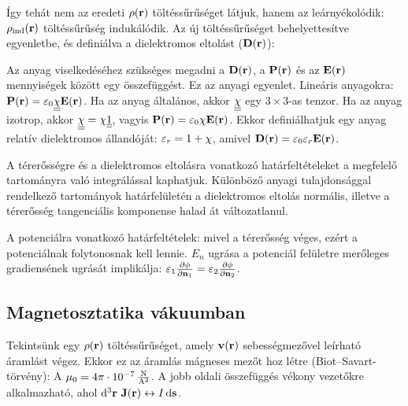    Így tehát nem az eredeti $\rho(\mathbf{r})$ töltéssűrűséget látjuk, hanem az leárnyékolódik: 
   $\rho_\text{ind}(\mathbf{r})$ töltéssűrűség indukálódik. 
   Az új töltéssűrűséget behelyettesítve  egyenletbe, és definiálva a dielektromos eltolást ($\mathbf{D}(\mathbf{r})$):
   
   Az anyag viselkedéséhez szükséges megadni a $\mathbf{D}(\mathbf{r})$, a $\mathbf{P}(\mathbf{r})$ és az $\mathbf{E}(\mathbf{r})$ mennyiségek között egy összefüggést. Ez az anyagi egyenlet. Lineáris anyagokra: $\mathbf{P}(\mathbf{r})=\varepsilon_0\underline{\underline{\chi}}\mathbf{E}(\mathbf{r})$. Ha az anyag általános, akkor $\underline{\underline{\chi}}$ egy $3\times 3$-as tenzor. Ha az anyag izotrop, akkor $\underline{\underline{\chi}}=\chi\underline{\underline{1}}$, vagyis $\mathbf{P}(\mathbf{r})=\varepsilon_0\chi\mathbf{E}(\mathbf{r})$. Ekkor definiálhatjuk egy anyag relatív dielektromos állandóját: $\varepsilon_r=1+\chi$, amivel $\mathbf{D}(\mathbf{r})=\varepsilon_0\varepsilon_r\mathbf{E}(\mathbf{r})$. 
   
   A térerősségre és a dielektromos eltolásra vonatkozó határfeltételeket a megfelelő tartományra való integrálással kaphatjuk. Különböző anyagi tulajdonsággal rendelkező tartományok határfelületén a dielektromos eltolás normális, illetve a térerősség tangenciális komponense halad át változatlanul. 
   
   A potenciálra vonatkozó határfeltételek: mivel a térerősség véges, ezért a potenciálnak folytonosnak kell lennie. $E_n$ ugrása a potenciál felületre merőleges gradiensének ugrását implikálja: $\varepsilon_1\frac{\partial \phi}{\partial \mathbf{n}_1}=\varepsilon_2\frac{\partial \phi}{\partial \mathbf{n}_2}$. 
   
  \subsection{Magnetosztatika vákuumban}
   
   Tekintsünk egy $\rho(\mathbf{r})$ töltéssűrűséget, amely $\mathbf{v}(\mathbf{r})$ sebességmezővel leírható áramlást végez. Ekkor ez az áramlás mágneses mezőt hoz létre (Biot--Savart-törvény):
   A $\mu_0=4\pi\cdot 10^{-7}\mathrm{\, \frac{N}{A^2}}$. A jobb oldali összefüggés vékony vezetőkre alkalmazható, ahol $\mathrm{d}^3\mathbf{r}\,\,\mathbf{J}(\mathbf{r})\leftrightarrow I\,\mathrm{d} \mathbf{s}$.
   
